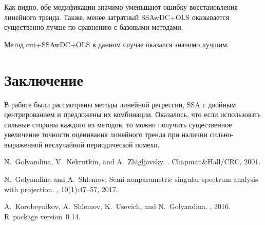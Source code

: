 \documentclass{spisok-article}
\begin{document}
Как видно, обе модификации значимо уменьшают ошибку восстановления линейного тренда.
Также, менее затратный SSAwDC+OLS оказывается существенно лучше по сравнению с базовыми методами.

Метод cut+SSAwDC+OLS в данном случае оказался значимо лучшим.

\section{Заключение}

В работе были рассмотрены методы линейной регрессии, SSA с двойным центрированием и предложены их комбинации.
Оказалось, что если использовать сильные стороны каждого из методов, то можно получить существенное
увеличение точности оценивания линейного тренда при наличии сильно-выраженной неслучайной периодической помехи.

\begin{thebibliography}{1}

N.~Golyandina, V.~Nekrutkin, and A.~Zhigljavsky.
.
\newblock Chapman\&Hall/CRC, 2001.

N.~Golyandina and A.~Shlemov.
\newblock Semi-nonparametric singular spectrum analysis with projection.
, 10(1):47--57, 2017.

A.~Korobeynikov, A.~Shlemov, K.~Usevich, and N.~Golyandina.
, 2016.
\newblock R~package version~0.14.

\end{thebibliography}

%
\end{document}
